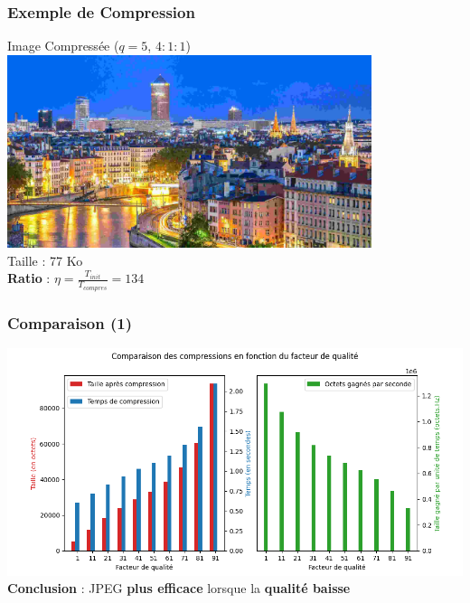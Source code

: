 \documentclass[aspectratio=43]{beamer}
\begin{document}
\begin{frame}
    \frametitle{Exemple de Compression}

    \centering
    Image Compressée ($q = 5$, $4:1:1$) \\
    \includegraphics[width = 0.8\textwidth]{img/villeLyonLow.jpg} \\
    Taille : 77 Ko \\
    \textbf{Ratio} : $\eta = \frac{T_{init}}{T_{compres}} = 134$

\end{frame}

\begin{frame}
    \frametitle{Comparaison (1)}

    \centering
    \includegraphics[width=\textwidth]{img/compressionComparaison.png} \\
    \textbf{Conclusion} : JPEG \textbf{plus efficace} lorsque la \textbf{qualité baisse} 

\end{frame}
\end{document}
